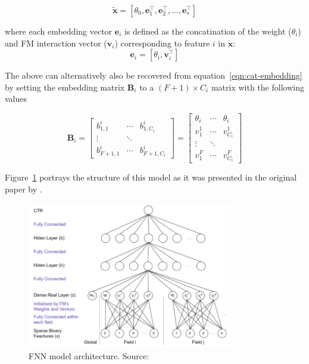 \documentclass{mldsmsc}
\begin{document}
\begin{equation*}
\tilde{\mathbf{x}} = \left[\theta_0, \mathbf{e}_1^{\intercal}, \mathbf{e}_2^{\intercal}, \ldots, \mathbf{e}_s^{\intercal}\right]
\end{equation*}

where each embedding vector $\mathbf{e}_i$ is defined as the concatination of
the weight ($\theta_i$) and FM interaction vector ($\mathbf{v}_i$) corresponding to feature
$i$ in $\dot{\mathbf{x}}$:
\begin{equation*}
    \mathbf{e}_i = \left[\theta_i, \mathbf{v}_i^{\intercal}\right]
\end{equation*}

The above can alternatively also be recovered from equation~\ref{eqn:cat-embedding} by
setting the embedding matrix $\mathbf{B}_i$ to a $(F+1) \times C_i$ matrix with the following
values

\begin{equation*}
\mathbf{B}_i = \begin{bmatrix}
    b_{1,1}^i & \cdots & b_{1 ,C_i}^i\\
    \vdots & \ddots & \\
    b_{F+1, 1}^i & \cdots & b_{F+1, C_i}^i
    \end{bmatrix}
= \begin{bmatrix}
    \theta_i & \cdots & \theta_i\\
    v_{1}^1 & \cdots & v_{C_i}^1 \\
    \vdots & \ddots & \\
    v_{1}^{F}& \cdots & v_{C_i}^{F}
    \end{bmatrix}
\end{equation*}

Figure~\ref{fig:fnn} portrays the structure of this model as it was presented in the original
paper by \cite{RefWorks:zhang2016deep}.

\begin{figure}[h]
    \centering
    \includegraphics[width=0.8\textwidth]{../figures/fnn.png}
    \caption{FNN model architecture. Source: \citep{RefWorks:zhang2016deep}}
    \label{fig:fnn}
\end{figure}
\end{document}
